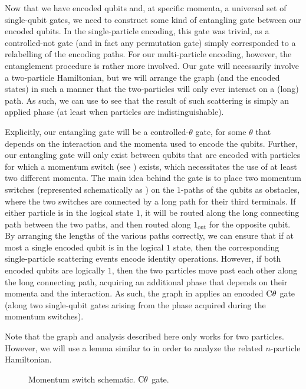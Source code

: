 \documentclass[../thesis-main/thesis-main]{subfiles}
\begin{document}
Now that we have encoded qubits and, at specific momenta, a universal set of single-qubit gates, we need to construct some kind of entangling gate between our encoded qubits.  In the single-particle encoding, this gate was trivial, as a controlled-not gate (and in fact any permutation gate) simply corresponded to a relabelling of the encoding paths.  For our multi-particle encoding, however, the entanglement procedure is rather more involved.  Our gate will necessarily involve a two-particle Hamiltonian, but we will arrange the graph (and the encoded states) in such a manner that the two-particles will only ever interact on a (long) path.  As such, we can use  to see that the result of such scattering is simply an applied phase (at least when particles are indistinguishable).

Explicitly, our entangling gate will be a controlled-$\theta$ gate, for some $\theta$ that depends on the interaction and the momenta used to encode the qubits.  Further, our entangling gate will only exist between qubits that are encoded with particles for which a momentum switch (see ) exists, which necessitates the use of at least two different momenta.  The main idea behind the gate is to place two momentum switches (represented schematically as ) on the $1$-paths of the qubits as obstacles, where the two switches are connected by a long path for their third terminals.  If either particle is in the logical state $1$, it will be routed along the long connecting path between the two paths, and then routed along $1_{\text{out}}$ for the opposite qubit.  By arranging the lengths of the various paths correctly, we can ensure that if at most a single encoded qubit is in the logical $1$ state, then the corresponding single-particle scattering events encode identity operations.  However, if both encoded qubits are logically $1$, then the two particles move past each other along the long connecting path, acquiring an additional phase that depends on their momenta and the interaction.  As such, the graph in  applies an encoded $\mathrm{C}\theta$ gate (along two single-qubit gates arising from the phase acquired during the momentum switches).

Note that the graph and analysis described here only works for two particles.  However, we will use a lemma similar to  in order to analyze the related $n$-particle Hamiltonian.

\begin{figure}
\centering
{}
\hspace{0.5cm}
\caption{ Momentum switch schematic.  $\mathrm{C}\theta$ gate.}
\label{fig:onepsplit}
\end{figure}
\end{document}

